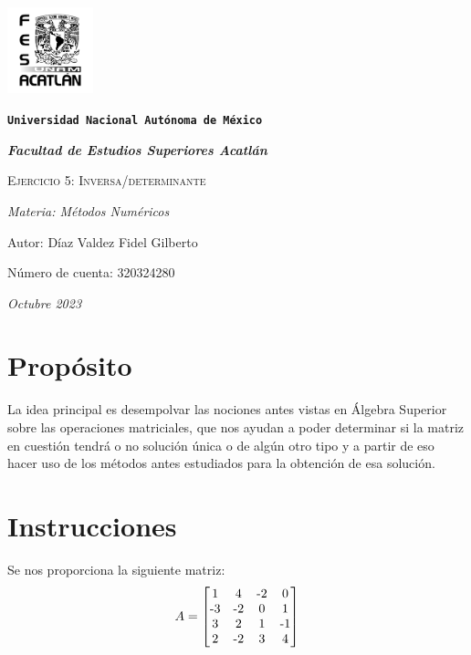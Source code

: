 \documentclass{article}
\begin{document}
\begin{titlepage}
   \centering


   {\includegraphics[width=2.5cm]{logo.png}\par}


   {\texttt{\bfseries \LARGE Universidad Nacional Autónoma de México} \par}
   \vspace{1cm}


   {\itshape \Large \bfseries Facultad de Estudios Superiores Acatlán \par}
   \vspace{3cm}


   {\scshape \Huge Ejercicio 5: Inversa/determinante\par}
   \vspace {3cm}


   {\slshape \Large Materia: Métodos Numéricos \par}
   \vspace{2cm}


   {\Large Autor: Díaz Valdez Fidel Gilberto\par}
   {\Large Número de cuenta: 320324280\par}
   \vfill


   {\itshape Octubre 2023 \par}
\end{titlepage}


\section{Propósito}
La idea principal es desempolvar las nociones antes vistas en Álgebra Superior sobre las
operaciones matriciales, que nos ayudan a poder determinar si la matriz en cuestión tendrá
o no solución única o de algún otro tipo y a partir de eso hacer uso de los métodos antes
estudiados para la obtención de esa solución.


\section{Instrucciones}
Se nos proporciona la siguiente matriz:
\begin{equation*}
   A =
   \begin{bmatrix}
       1   &  4  & $-2$ &  0 \\
      $-3$   & $-2$  &  0 &  1 \\
       3   &  2  &  1 & $-1$ \\
       2   & $-2$ &  3 &  4 \\
   \end{bmatrix}
\end{equation*}
\end{document}
